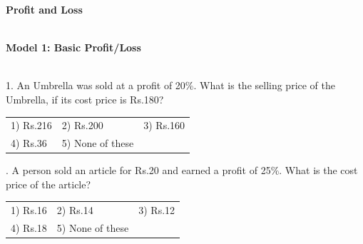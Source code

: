 \documentclass{article}
\begin{document}
	
	
	
	\noindent 
	
	\noindent 
	
	\noindent 
	
	\noindent 
	
	\noindent \begin{center}
		{\Large \textbf{Profit and Loss \\}}
	\end{center}
	
	\noindent 
	
	\noindent 
	
	\noindent 
	
	\noindent 
	
	
	\noindent \\
	
	\noindent \textbf{Model 1: Basic Profit/Loss \\}
	
	\noindent 
	
	\noindent \\ 1.   An Umbrella was sold at a profit of 20\%. What is the selling price of the Umbrella, if its cost price is Rs.180?
	
	\noindent  
	\begin{tabular}{p{1.7in} p{1.6in} p{1.6in}} \\ 
 1) Rs.216                 & 2) Rs.200          & 3) Rs.160      \\
     4) Rs.36            & 5) None of these  \\
\end{tabular}
	
	\noindent 
	
	\noindent 
	
	\noindent 
	
	.   A person sold an article for Rs.20 and earned a profit of 25\%. What is the cost price of the article?
	
	\noindent  
	\begin{tabular}{p{1.7in} p{1.6in} p{1.6in}} \\ 
 1) Rs.16                   & 2) Rs.14            & 3) Rs.12      \\
      4) Rs.18            & 5) None of these  \\
\end{tabular}
	
	\noindent 
	
	\noindent 
	
\end{document}
